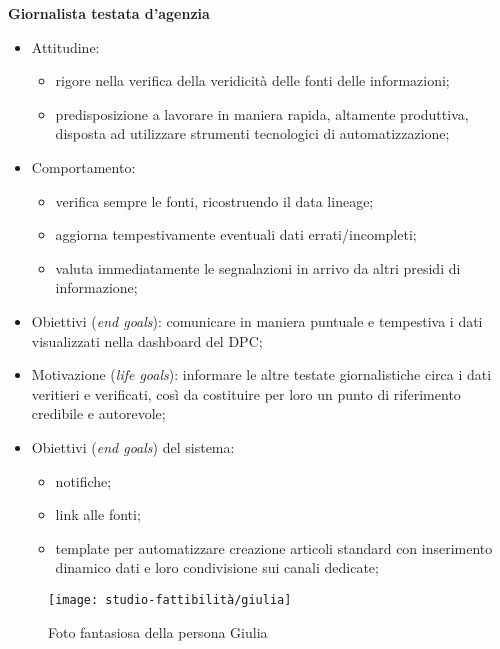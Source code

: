 \textbf{Giornalista testata d'agenzia}
\begin{itemize}
	\item Attitudine:
    \begin{itemize}
        \item rigore nella verifica della veridicità delle fonti delle informazioni;
        \item predisposizione a lavorare in maniera rapida, altamente produttiva, disposta ad utilizzare strumenti tecnologici di automatizzazione;
    \end{itemize}
    \item Comportamento: 
    \begin{itemize}
        \item verifica sempre le fonti, ricostruendo il data lineage;
        \item aggiorna tempestivamente eventuali dati errati/incompleti;
        \item valuta immediatamente le segnalazioni in arrivo da altri presidi di informazione;
    \end{itemize}
    \item Obiettivi (\textit{end goals}): comunicare in maniera puntuale e tempestiva i dati visualizzati nella dashboard del DPC;
    \item Motivazione (\textit{life goals}): informare le altre testate giornalistiche circa i dati veritieri e verificati, così da costituire per loro un punto di riferimento credibile e autorevole;
    \item Obiettivi (\textit{end goals}) del sistema:
    \begin{itemize}
        \item notifiche;
        \item link alle fonti;
        \item template per automatizzare creazione articoli standard con inserimento dinamico dati e loro condivisione sui canali dedicate;
    \end{itemize}
\end{itemize}

\begin{wrapfigure}{r}{7cm}
    \texttt{[image: studio-fattibilità/giulia]}
    \caption{Foto fantasiosa della persona Giulia}
\end{wrapfigure}


